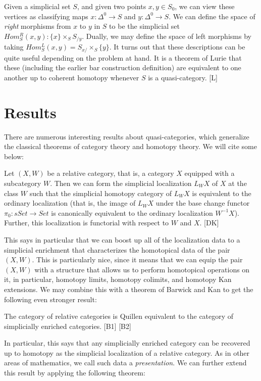 \documentclass{amsart}
\begin{document}
Given a simplicial set $S$, and given two points $x,y\in S_0$, we can view these vertices as classifying maps $x:\Delta^0\to S$ and $y:\Delta^{0}\to S$.  We can define the space of \emph{right} morphisms from $x$ to $y$ in $S$ to be the simplicial set $Hom^R_S(x,y):\{x\}\times_S S_{/y}$.  Dually, we may define the space of left morphisms by taking $Hom^L_S(x,y)=S_{x/}\times_S \{y\}$.  It turns out that these descriptions can be quite useful depending on the problem at hand.  It is a theorem of Lurie that these (including the earlier bar construction definition) are equivalent  to one another up to coherent homotopy whenever $S$ is a quasi-category. [L] 

\section{Results}

There are numerous interesting results about quasi-categories, which generalize the classical theorems of category theory and homotopy theory.  We will cite some below: 

\begin{thm}
Let $(X,W)$ be a relative category, that is, a category $X$ equipped with a subcategory $W$.  Then we can form the simplicial localization $L_WX$ of $X$ at the class $W$ such that the simplicial homotopy category of $L_WX$ is equivalent to the ordinary localization (that is, the image of $L_WX$ under the base change functor $\pi_0: sSet\to Set$ is canonically equivalent to the ordinary localization $W^{-1}X$).  Further, this localization is functorial with respect to $W$ and $X$.  [DK]
\end{thm}

This says in particular that we can boost up all of the localization data to a simplicial enrichment that characterizes the homotopical data of the pair $(X,W)$.  This is particularly nice, since it means that we can equip the pair $(X,W)$ with a structure that allows us to perform homotopical operations on it, in particular, homotopy limits, homotopy colimits, and homotopy Kan extensions.  We may combine this with a theorem of Barwick and Kan to get the following even stronger result:

\begin{thm}
The category of relative categories is Quillen equivalent to the category of simplicially enriched categories. [B1] [B2]
\end{thm}

In particular, this says that any simplicially enriched category can be recovered up to homotopy as the simplicial localization of a relative category.  As in other areas of mathematics, we call such data a \emph{presentation}.  We can further extend this result by applying the following theorem:
\end{document}
